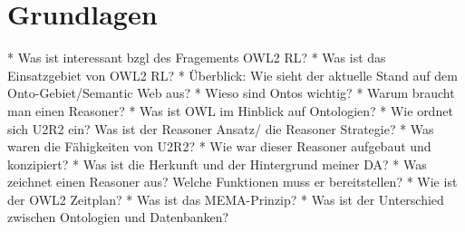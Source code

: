 \chapter{Grundlagen}
    * Was ist interessant bzgl des Fragements OWL2 RL?
    * Was ist das Einsatzgebiet von OWL2 RL?
    * Überblick: Wie sieht der aktuelle Stand auf dem Onto-Gebiet/Semantic Web aus?
    * Wieso sind Ontos wichtig?
    * Warum braucht man einen Reasoner?
    * Was ist OWL im Hinblick auf Ontologien?
    * Wie ordnet sich U2R2 ein? Was ist der Reasoner Ansatz/ die Reasoner Strategie?
    * Was waren die Fähigkeiten von U2R2?
    * Wie war dieser Reasoner aufgebaut und konzipiert?
    * Was ist die Herkunft und der Hintergrund meiner DA?
    * Was zeichnet einen Reasoner aus? Welche Funktionen muss er bereitstellen?
    * Wie ist der OWL2 Zeitplan?
    * Was ist das MEMA-Prinzip?
    * Was ist der Unterschied zwischen Ontologien und Datenbanken? 